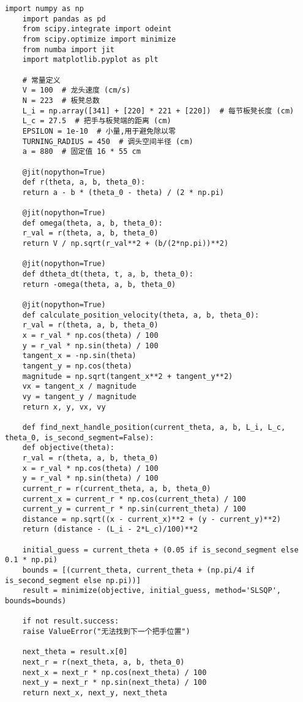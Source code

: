 
\begin{lstlisting}[caption={问题三处理代码1}]
	import numpy as np
	import pandas as pd
	from scipy.integrate import odeint
	from scipy.optimize import minimize
	from numba import jit
	import matplotlib.pyplot as plt
	
	# 常量定义
	V = 100  # 龙头速度 (cm/s)
	N = 223  # 板凳总数
	L_i = np.array([341] + [220] * 221 + [220])  # 每节板凳长度 (cm)
	L_c = 27.5  # 把手与板凳端的距离 (cm)
	EPSILON = 1e-10  # 小量,用于避免除以零
	TURNING_RADIUS = 450  # 调头空间半径 (cm)
	a = 880  # 固定值 16 * 55 cm
	
	@jit(nopython=True)
	def r(theta, a, b, theta_0):
	return a - b * (theta_0 - theta) / (2 * np.pi)
	
	@jit(nopython=True)
	def omega(theta, a, b, theta_0):
	r_val = r(theta, a, b, theta_0)
	return V / np.sqrt(r_val**2 + (b/(2*np.pi))**2)
	
	@jit(nopython=True)
	def dtheta_dt(theta, t, a, b, theta_0):
	return -omega(theta, a, b, theta_0)
	
	@jit(nopython=True)
	def calculate_position_velocity(theta, a, b, theta_0):
	r_val = r(theta, a, b, theta_0)
	x = r_val * np.cos(theta) / 100
	y = r_val * np.sin(theta) / 100
	tangent_x = -np.sin(theta)
	tangent_y = np.cos(theta)
	magnitude = np.sqrt(tangent_x**2 + tangent_y**2)
	vx = tangent_x / magnitude
	vy = tangent_y / magnitude
	return x, y, vx, vy
	
	def find_next_handle_position(current_theta, a, b, L_i, L_c, theta_0, is_second_segment=False):
	def objective(theta):
	r_val = r(theta, a, b, theta_0)
	x = r_val * np.cos(theta) / 100
	y = r_val * np.sin(theta) / 100
	current_r = r(current_theta, a, b, theta_0)
	current_x = current_r * np.cos(current_theta) / 100
	current_y = current_r * np.sin(current_theta) / 100
	distance = np.sqrt((x - current_x)**2 + (y - current_y)**2)
	return (distance - (L_i - 2*L_c)/100)**2
	
	initial_guess = current_theta + (0.05 if is_second_segment else 0.1 * np.pi)
	bounds = [(current_theta, current_theta + (np.pi/4 if is_second_segment else np.pi))]
	result = minimize(objective, initial_guess, method='SLSQP', bounds=bounds)
	
	if not result.success:
	raise ValueError("无法找到下一个把手位置")
	
	next_theta = result.x[0]
	next_r = r(next_theta, a, b, theta_0)
	next_x = next_r * np.cos(next_theta) / 100
	next_y = next_r * np.sin(next_theta) / 100
	return next_x, next_y, next_theta
	

\end{lstlisting}
